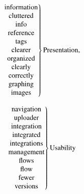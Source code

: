 \begin{minipage}[b]{0.32\textwidth}
\begin{equation*}
  \left. \begin{tabular}{c}
    \text{information} \\
    \text{cluttered} \\
    \text{info} \\
    \text{reference} \\
    \text{tags} \\
    \text{clearer} \\
    \text{organized} \\
    \text{clearly} \\
    \text{correctly} \\
    \text{graphing} \\
    \text{images} \\
  \end{tabular} \hspace{-0.2cm} \right \}
  \text{Presentation,}
\end{equation*}
\end{minipage}
\begin{minipage}[b]{0.32\textwidth}
\begin{equation*}
  \left. \begin{tabular}{c}
    \text{navigation} \\
    \text{uploader} \\
    \text{integration} \\
    \text{integrated} \\
    \text{integrations} \\
    \text{management} \\
    \text{flows} \\
    \text{flow} \\
    \text{fewer} \\
    \text{versions} \\
  \end{tabular} \hspace{-0.2cm} \right \}
  \text{Usability}
\end{equation*}
\end{minipage}
